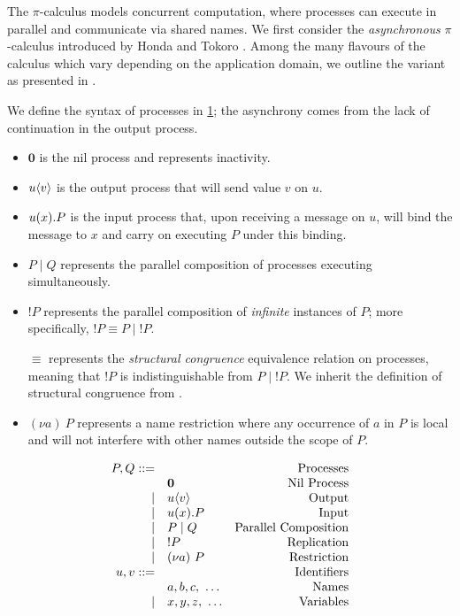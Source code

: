 The $\pi$-calculus models concurrent computation, 
where processes can execute in parallel and communicate 
via shared names.
We first consider the \textit{asynchronous} 
$\pi$-calculus introduced by 
Honda and Tokoro \cite{AsyncHonda}.
Among the many flavours of the calculus 
which vary depending on the application domain,
we outline the variant as presented in \cite{C406Lecture}. 

We define the syntax of processes in \cref{fig:async};
the asynchrony comes from the lack of 
continuation in the output process.

\begin{itemize}
\item $\mathbf{0}$ is the nil process and represents inactivity.
\item ${{u}\langle {v} \rangle}$ is the output process that will send value $v$ on $u$.
\item ${{u}({x})}.P$ is the input process that,
 upon receiving a message on $u$, 
 will bind the message to $x$ and 
 carry on executing $P$ under this binding.
\item $P\mid Q$ represents the parallel composition of 
processes executing simultaneously.
\item $!P$ represents the parallel composition of 
\textit{infinite} instances of $P$; 
more specifically, $!P \equiv P \mid {!P}$.

$\equiv$ represents the \textit{structural congruence} 
equivalence relation
on processes, meaning that $!P$ is indistinguishable from 
$P \mid {!P}$. We inherit the definition of structural congruence from
\cite{C406Lecture}.

\item $(\nu a)~P$ represents a name restriction 
where any occurrence of $a$ in $P$ is local
 and will not interfere with other names outside the scope of $P$.
\end{itemize}

\begin{figure}[!hb]
\doublespacing
\[
\begin{array}{rlr}

P,Q ::= & & \text{Processes} \\
     & \mathbf{0} & \text{Nil Process} \\
\mid & {{u}\langle {v} \rangle} & \text{Output} \\
\mid & {{u}({x})}.P & \text{Input} \\     
\mid & P \mid Q & \text{Parallel Composition} \\
\mid & !P & \text{Replication} \\
\mid & (\nu a)~P & \text{Restriction} \\

u,v ::= & & \text{Identifiers} \\
     & a, b, c,~\dots & \text{Names} \\
\mid & x, y, z,~\dots & \text{Variables} \\

\end{array}
\]
\singlespacing
{}
\label{fig:async}
\end{figure}

